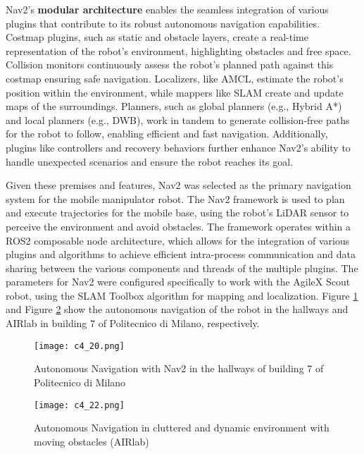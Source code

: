 Nav2's \textbf{modular architecture} enables the seamless integration of various plugins that contribute
to its robust autonomous navigation capabilities. Costmap plugins, such as static and obstacle layers,
create a real-time representation of the robot's environment, highlighting obstacles and free space. 
Collision monitors continuously assess the robot's planned path against this costmap ensuring safe navigation.
Localizers, like AMCL, estimate the robot's position within the environment, while mappers like SLAM create and update maps
of the surroundings. Planners, such as global planners (e.g., Hybrid A*) and local planners (e.g., DWB),
work in tandem to generate collision-free paths for the robot to follow, enabling efficient and fast navigation. 
Additionally, plugins like controllers and recovery behaviors further enhance Nav2's ability to handle unexpected
scenarios and ensure the robot reaches its goal.

Given these premises and features, Nav2 was selected as the primary navigation system for the mobile manipulator robot.
The Nav2 framework is used to plan and execute trajectories for the mobile base, using the robot's
LiDAR sensor to perceive the environment and avoid obstacles. The framework operates within a ROS2 
composable node architecture, which allows for the integration of various plugins and algorithms to achieve
efficient intra-process communication and data sharing between the various components and threads of the multiple plugins.
The parameters for Nav2 were configured specifically to work with the AgileX Scout robot, using the SLAM Toolbox algorithm
for mapping and localization. Figure \ref{fig:nav2_hallway} and Figure \ref{fig:nav2_airlab} show the autonomous
navigation of the robot in the hallways and AIRlab in building 7 of Politecnico di Milano, respectively.

\begin{figure}[t]
    \centering
    \texttt{[image: c4\_20.png]}
    \caption{Autonomous Navigation with Nav2 in the hallways of building 7 of Politecnico di Milano}
    \label{fig:nav2_hallway}
\end{figure}

\begin{figure}[t]
    \centering
    \texttt{[image: c4\_22.png]}
    \caption{Autonomous Navigation in cluttered and dynamic environment with moving obstacles (AIRlab)}
    \label{fig:nav2_airlab}
\end{figure}


